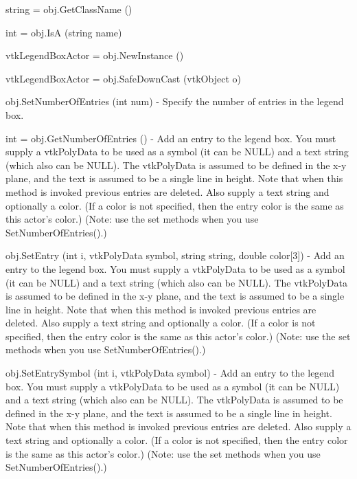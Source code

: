 \begin{DoxyItemize}
\item {\ttfamily string = obj.\-Get\-Class\-Name ()}  
\item {\ttfamily int = obj.\-Is\-A (string name)}  
\item {\ttfamily vtk\-Legend\-Box\-Actor = obj.\-New\-Instance ()}  
\item {\ttfamily vtk\-Legend\-Box\-Actor = obj.\-Safe\-Down\-Cast (vtk\-Object o)}  
\item {\ttfamily obj.\-Set\-Number\-Of\-Entries (int num)} -\/ Specify the number of entries in the legend box.  
\item {\ttfamily int = obj.\-Get\-Number\-Of\-Entries ()} -\/ Add an entry to the legend box. You must supply a vtk\-Poly\-Data to be used as a symbol (it can be N\-U\-L\-L) and a text string (which also can be N\-U\-L\-L). The vtk\-Poly\-Data is assumed to be defined in the x-\/y plane, and the text is assumed to be a single line in height. Note that when this method is invoked previous entries are deleted. Also supply a text string and optionally a color. (If a color is not specified, then the entry color is the same as this actor's color.) (Note\-: use the set methods when you use Set\-Number\-Of\-Entries().)  
\item {\ttfamily obj.\-Set\-Entry (int i, vtk\-Poly\-Data symbol, string string, double color\mbox{[}3\mbox{]})} -\/ Add an entry to the legend box. You must supply a vtk\-Poly\-Data to be used as a symbol (it can be N\-U\-L\-L) and a text string (which also can be N\-U\-L\-L). The vtk\-Poly\-Data is assumed to be defined in the x-\/y plane, and the text is assumed to be a single line in height. Note that when this method is invoked previous entries are deleted. Also supply a text string and optionally a color. (If a color is not specified, then the entry color is the same as this actor's color.) (Note\-: use the set methods when you use Set\-Number\-Of\-Entries().)  
\item {\ttfamily obj.\-Set\-Entry\-Symbol (int i, vtk\-Poly\-Data symbol)} -\/ Add an entry to the legend box. You must supply a vtk\-Poly\-Data to be used as a symbol (it can be N\-U\-L\-L) and a text string (which also can be N\-U\-L\-L). The vtk\-Poly\-Data is assumed to be defined in the x-\/y plane, and the text is assumed to be a single line in height. Note that when this method is invoked previous entries are deleted. Also supply a text string and optionally a color. (If a color is not specified, then the entry color is the same as this actor's color.) (Note\-: use the set methods when you use Set\-Number\-Of\-Entries().)  

\end{DoxyItemize}
